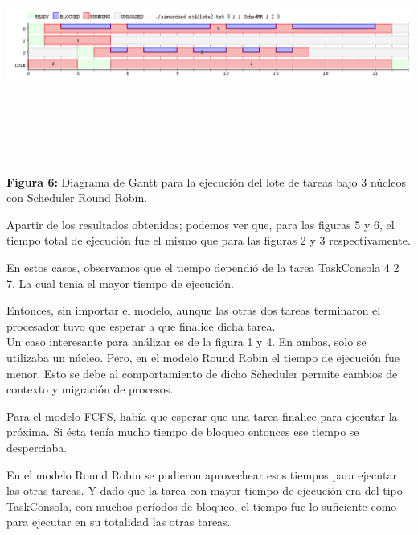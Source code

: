 \documentclass[a4paper]{article}
\begin{document}
  \includegraphics[width=\textwidth,height=3.0in,keepaspectratio]{imagenes/ej4/3core.png} \newline
\begin {flushleft}
\textbf{Figura 6:} Diagrama de Gantt para la ejecuci\'on del lote de tareas bajo 3 n\'ucleos con Scheduler Round Robin.
\end{flushleft}
 
\bigskip 
 
Apartir de los resultados obtenidos; podemos ver que, para las figuras 5 y 6, el tiempo total de ejecución fue el mismo que para las figuras 2 y 3 respectivamente. 

En estos casos, observamos que el tiempo dependió de la tarea TaskConsola 4 2 7. La cual tenia el mayor tiempo de ejecución. 

Entonces, sin importar el modelo, aunque las otras dos tareas terminaron el procesador tuvo que esperar a que finalice dicha tarea.\\

Un caso interesante para análizar es de la figura 1 y 4. En ambas, solo se utilizaba un núcleo. Pero, en el modelo Round Robin el tiempo de ejecución fue menor. Esto se debe al comportamiento de dicho Scheduler permite cambios de contexto y migración de procesos.

 Para el modelo FCFS, había que esperar que una tarea finalice para ejecutar la próxima. Si ésta tenía mucho tiempo de bloqueo entonces ese tiempo se desperciaba. 
 
 En el modelo Round Robin se pudieron aprovechear esos tiempos para ejecutar las otras tareas. Y dado que la tarea con mayor tiempo de ejecución era del tipo TaskConsola, con muchos períodos de bloqueo, el tiempo fue lo suficiente como para ejecutar en su totalidad las otras tareas.  
 \bigskip
 
\end{document}
